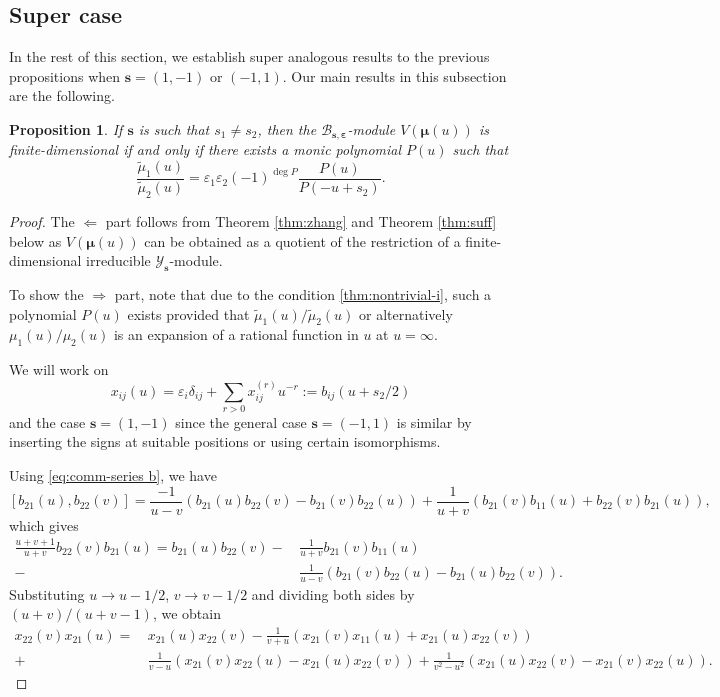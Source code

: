 \documentclass[11pt,reqno]{amsart}
\numberwithin{equation}{section}
\newtheorem{prop}[thm]{Proposition}
\theoremstyle{definition}
\theoremstyle{remark}
\newcommand{\beq}{\begin{equation}}
\newcommand{\eeq}{\end{equation}}
\newcommand{\tl}{\tilde}
\newcommand{\YMN}{{\mathscr{Y}_{\bm s}}}
\newcommand{\BMN}{{\mathscr{B}_{\bm s,\bm \ve}}}
\newcommand{\ve}{\varepsilon}
\newcommand{\s}{{\bm s}}
\begin{document}
\subsection{Super case}
In the rest of this section, we establish super analogous results to the previous propositions when $\s=(1,-1)$ or $(-1,1)$. Our main results in this subsection are the following.
\begin{prop}\label{prop:rank1}
If $\bm s$ is such that $s_1\ne s_2$, then the $\BMN$-module $V(\bm\mu(u))$ is finite-dimensional if and only if there exists a monic polynomial $P(u)$ such that
\[
\frac{\tl \mu_1(u)}{\tl \mu_2(u)}=\ve_1\ve_2(-1)^{\deg P}\frac{P(u)}{P(-u+s_2)}.
\]
\end{prop}
\begin{proof}
The $\Longleftarrow$ part follows from Theorem \ref{thm:zhang} and Theorem \ref{thm:suff} below as $V(\bm\mu(u))$ can be obtained as a quotient of the restriction of a finite-dimensional irreducible $\YMN$-module.

To show the $\Longrightarrow$ part, note that due to the condition \eqref{thm:nontrivial-i}, such a polynomial $P(u)$ exists provided that ${\tl \mu_1(u)}/{\tl \mu_2(u)}$ or alternatively $\mu_1(u)/\mu_2(u)$ is an expansion of a rational function in $u$ at $u=\infty$.

We will work on
$$
x_{ij}(u)=\ve_i\delta_{ij}+\sum_{r>0}x_{ij}^{(r)}u^{-r}:=b_{ij}(u+s_2/2)
$$
and the case $\bm s=(1,-1)$ since the general case $\bm s=(-1,1)$ is similar by inserting the signs at suitable positions or using certain isomorphisms.

Using \eqref{eq:comm-series b}, we have
\[
[b_{21}(u),b_{22}(v)]=\frac{-1}{u-v}(b_{21}(u)b_{22}(v)-b_{21}(v)b_{22}(u))+\frac{1}{u+v}(b_{21}(v)b_{11}(u)+b_{22}(v)b_{21}(u)),
\]
which gives
\begin{align*}
\frac{u+v+1}{u+v}b_{22}(v)b_{21}(u)=b_{21}(u)b_{22}(v)-&\,\frac{1}{u+v}b_{21}(v)b_{11}(u)\\-&\,\frac{1}{u-v}(b_{21}(v)b_{22}(u)-b_{21}(u)b_{22}(v)).
\end{align*}
Substituting $u\to u-1/2$, $v\to v-1/2$ and dividing both sides by $(u+v)/(u+v-1)$, we obtain
\beq\label{eq:new-b}
\begin{split}
x_{22}(v)x_{21}(u)=&\, x_{21}(u)x_{22}(v)-\frac{1}{v+u}(x_{21}(v)x_{11}(u)+x_{21}(u)x_{22}(v))\\
+&\, \frac{1}{v-u}(x_{21}(v)x_{22}(u)-x_{21}(u)x_{22}(v))+\frac{1}{v^2-u^2}(x_{21}(u)x_{22}(v)-x_{21}(v)x_{22}(u)).
\end{split}
\eeq



\end{proof}
\end{document}
